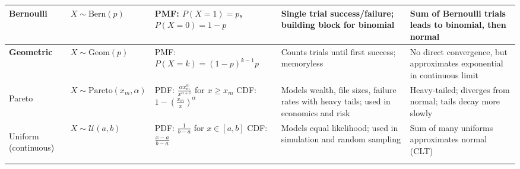 \documentclass[10pt]{article}
\begin{document}
\begin{longtable}{|>{\bfseries}m{2cm}|m{2.8cm}|p{4.5cm}|p{5.2cm}|p{4.5cm}|}
  Bernoulli & $X \sim \mathrm{Bern}(p)$ &
  PMF: $P(X=1) = p$, $P(X=0) = 1 - p$ &
  Single trial success/failure; building block for binomial &
  Sum of Bernoulli trials leads to binomial, then normal \\
  \hline

  Geometric & $X \sim \mathrm{Geom}(p)$ &
  PMF: $P(X = k) = (1 - p)^{k - 1} p$ &
  Counts trials until first success; memoryless &
  No direct convergence, but approximates exponential in continuous limit \\
  \hline

		Pareto & $X \sim \mathrm{Pareto}(x_m, \alpha)$ &
  PDF: $\frac{\alpha x_m^\alpha}{x^{\alpha + 1}}$ for $x \ge x_m$ \newline
  CDF: $1 - \left(\frac{x_m}{x}\right)^\alpha$ &
  Models wealth, file sizes, failure rates with heavy tails; used in economics and risk &
  Heavy-tailed; diverges from normal; tails decay more slowly \\
  \hline

  Uniform (continuous) & $X \sim \mathcal{U}(a, b)$ &
  PDF: $\frac{1}{b - a}$ for $x \in [a, b]$ \newline
  CDF: $\frac{x - a}{b - a}$ &
  Models equal likelihood; used in simulation and random sampling &
  Sum of many uniforms approximates normal (CLT) \\
  \hline

\end{longtable}
\end{document}
